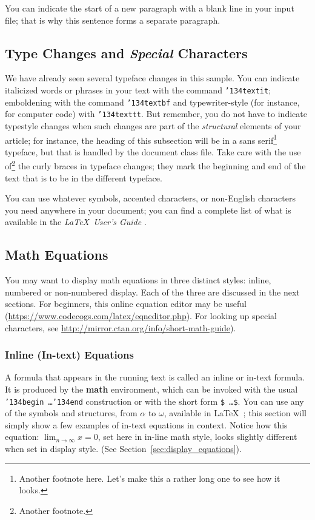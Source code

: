 \documentclass[12pt,MSc,a4paper,oneside]{muthesis}
\begin{document}
You can indicate the start of a new paragraph with a blank line in your input
file; that is why this sentence forms a separate paragraph.

\subsection{Type Changes and {\itshape Special} Characters}

We have already seen several typeface changes in this sample.  You can
indicate italicized words or phrases in your text with the command
\texttt{{\char'134}textit}; emboldening with the command
\texttt{{\char'134}textbf} and typewriter-style (for instance, for
computer code) with \texttt{{\char'134}texttt}.  But remember, you do
not have to indicate typestyle changes when such changes are part of
the \textit{structural} elements of your article; for instance, the
heading of this subsection will be in a sans serif\footnote{Another
  footnote here.  Let's make this a rather long one to see how it
  looks.} typeface, but that is handled by the document class file.
Take care with the use of\footnote{Another footnote.}  the
curly braces in typeface changes; they mark the beginning and end of
the text that is to be in the different typeface.

You can use whatever symbols, accented characters, or non-English
characters you need anywhere in your document; you can find a complete
list of what is available in the \textit{\LaTeX\ User's Guide}
\citep{Lamport:LaTeX}.

\subsection{Math Equations}
You may want to display math equations in three distinct styles:
inline, numbered or non-numbered display.  Each of
the three are discussed in the next sections. For beginners, this online equation editor may be useful (\url{https://www.codecogs.com/latex/eqneditor.php}). For looking up special characters, see \url{http://mirror.ctan.org/info/short-math-guide}).

\subsubsection{Inline (In-text) Equations}
A formula that appears in the running text is called an
inline or in-text formula.  It is produced by the
\textbf{math} environment, which can be
invoked with the usual \texttt{{\char'134}begin\,\ldots{\char'134}end}
construction or with the short form \texttt{\$\,\ldots\$}. You
can use any of the symbols and structures,
from $\alpha$ to $\omega$, available in
\LaTeX~\citep{Lamport:LaTeX}; this section will simply show a
few examples of in-text equations in context. Notice how
this equation:
\begin{math}
  \lim_{n\rightarrow \infty}x=0
\end{math},
set here in in-line math style, looks slightly different when
set in display style.  (See Section~\ref{sec:display_equations}).
\end{document}
